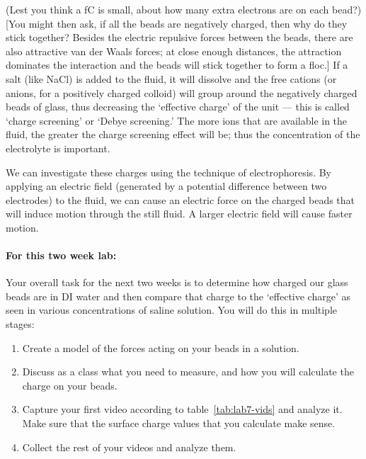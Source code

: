 (Lest you think a fC is small, about how many extra electrons are on each bead?) 
[You might then ask, if all the beads are negatively charged, then why do they stick together? 
Besides the electric repulsive forces between the beads, there are also attractive van der Waals forces; at close enough distances, the attraction dominates the interaction and the beads will stick together to form a floc.] 
If a salt (like NaCl) is added to the fluid, it will dissolve and the free cations (or anions, for a positively charged colloid) will group around the negatively charged beads of glass, thus decreasing the `effective charge' of the unit — this is called `charge screening' or `Debye screening.' 
The more ions that are available in the fluid, the greater the charge screening effect will be; thus the concentration of the electrolyte is important.
\par 
We can investigate these charges using the technique of electrophoresis. 
By applying an electric field (generated by a potential difference between two electrodes) to the fluid, we can cause an electric force on the charged beads that will induce motion through the still fluid.
A larger electric field will cause faster motion. 

\paragraph{For this two week lab:} Your overall task for the next two weeks is to determine how charged our glass beads are in DI water and then compare that charge to the `effective charge' as seen in various concentrations of saline solution.
You will do this in multiple stages:
\begin{enumerate}
\itemsep-0.2em
\item Create a model of the forces acting on your beads in a solution.
\item Discuss as a class what you need to measure, and how you will calculate the charge on your beads.
\item Capture your first video according to table~\ref{tab:lab7-vids} and analyze it. Make sure that the surface charge values that you calculate make sense.
\item Collect the rest of your videos and analyze them.
\end{enumerate}

